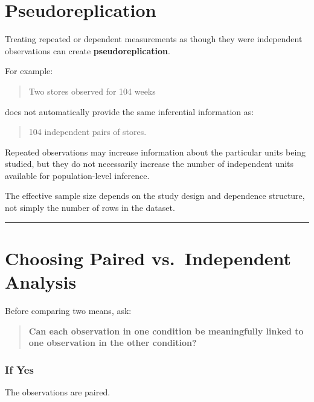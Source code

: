 \documentclass[
  letterpaper,
  DIV=11,
  numbers=noendperiod]{scrreprt}
\begin{document}

\chapter{Pseudoreplication}\label{pseudoreplication}

Treating repeated or dependent measurements as though they were
independent observations can create \textbf{pseudoreplication}.

For example:

\begin{quote}
Two stores observed for 104 weeks
\end{quote}

does not automatically provide the same inferential information as:

\begin{quote}
104 independent pairs of stores.
\end{quote}

Repeated observations may increase information about the particular
units being studied, but they do not necessarily increase the number of
independent units available for population-level inference.

The effective sample size depends on the study design and dependence
structure, not simply the number of rows in the dataset.

\begin{center}\rule{0.5\linewidth}{0.5pt}\end{center}


\chapter{Choosing Paired vs.~Independent
Analysis}\label{choosing-paired-vs.-independent-analysis}

Before comparing two means, ask:

\begin{quote}
\textbf{Can each observation in one condition be meaningfully linked to
one observation in the other condition?}
\end{quote}

\subsection{If Yes}\label{if-yes}

The observations are paired.
\end{document}
